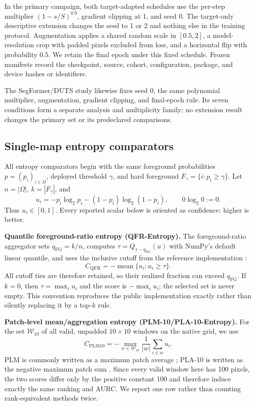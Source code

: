 In the primary campaign, both target-adapted schedules use the per-step
multiplier \((1-s/S)^{0.9}\), gradient clipping at 1, and seed 0. The target-only
descriptive extension changes the seed to 1 or 2 and nothing else in the
training protocol. Augmentation applies a shared random scale in \([0.5,2]\), a
model-resolution crop with padded pixels excluded from loss, and a horizontal
flip with probability \(0.5\). We retain the final epoch under this fixed
schedule. Frozen manifests record the checkpoint, source, cohort,
configuration, package, and device hashes or identifiers.

The SegFormer/DUTS study likewise fixes seed 0, the same polynomial multiplier,
augmentation, gradient clipping, and final-epoch rule. Its seven conditions
form a separate analysis and multiplicity family; no extension result changes
the primary set or its predeclared comparisons.

\subsection{Single-map entropy comparators}

All entropy comparators begin with the same foreground probabilities
\(p=(p_i)_{i\in\Omega}\), deployed threshold \(\gamma\), and hard foreground
\(F_\gamma=\{i:p_i\geq\gamma\}\). Let \(n=|\Omega|\), \(k=|F_\gamma|\), and
\[
  u_i=-p_i\log_2p_i-(1-p_i)\log_2(1-p_i),
  \qquad 0\log_2 0:=0.
\]
Thus \(u_i\in[0,1]\). Every reported scalar below is oriented as confidence:
higher is better.

\noindent\textbf{Quantile foreground-ratio entropy (QFR-Entropy).}
The foreground-ratio aggregator sets \(q_{\mathrm{FG}}=k/n\), computes
\(\tau=Q_{1-q_{\mathrm{FG}}}(u)\) with NumPy's default linear quantile, and
uses the inclusive cutoff from the reference implementation
\citep{guarino2026aggregation}:
\[
 C_{\mathrm{QFR}}
 =-\operatorname{mean}\{u_i:u_i\geq\tau\}.
\]
All cutoff ties are therefore retained, so their realized fraction can exceed
\(q_{\mathrm{FG}}\). If \(k=0\), then \(\tau=\max_i u_i\) and the score is
\(-\max_i u_i\); the selected set is never empty. This convention reproduces
the public implementation exactly rather than silently replacing it by a
top-\(k\) rule.

\noindent\textbf{Patch-level mean/aggregation entropy (PLM-10/PLA-10-Entropy).}
For the set \(\mathcal W_{10}\) of all valid, unpadded \(10\times10\) windows on
the native grid, we use
\[
 C_{\mathrm{PLM10}}
 =-\max_{w\in\mathcal W_{10}}\frac{1}{|w|}\sum_{i\in w}u_i.
\]
PLM is commonly written as a maximum patch average
\citep{guarino2026aggregation}; PLA-10 is written as the negative maximum patch
sum \citep{sdc}. Since every valid window here has 100 pixels, the two scores
differ only by the positive constant 100 and therefore induce exactly the same
ranking and AURC. We report one row rather than counting rank-equivalent methods
twice.

